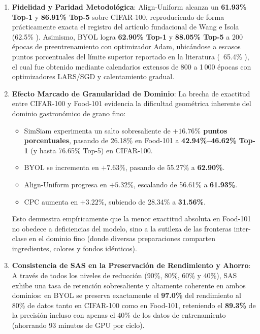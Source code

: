 \begin{enumerate}
    \item \textbf{Fidelidad y Paridad Metodológica}:
    Align-Uniform alcanza un \textbf{61.93\% Top-1} y \textbf{86.91\% Top-5} sobre CIFAR-100, reproduciendo de forma prácticamente exacta el registro del artículo fundacional de Wang e Isola (62.5\% \cite{wang2020alignuniform}). Asimismo, BYOL logra \textbf{62.90\% Top-1} y \textbf{88.05\% Top-5} a 200 épocas de preentrenamiento con optimizador Adam, ubicándose a escasos puntos porcentuales del límite superior reportado en la literatura (~65.4\% \cite{grill2020byol}), el cual fue obtenido mediante calendarios extensos de 800 a 1\,000 épocas con optimizadores LARS/SGD y calentamiento gradual.
    
    \item \textbf{Efecto Marcado de Granularidad de Dominio}:
    La brecha de exactitud entre CIFAR-100 y Food-101 evidencia la dificultad geométrica inherente del dominio gastronómico de grano fino:
    \begin{itemize}
        \item SimSiam experimenta un salto sobresaliente de \textbf{$+16.76\%$ puntos porcentuales}, pasando de 26.18\% en Food-101 a \textbf{42.94\%--46.62\% Top-1} (y hasta 76.65\% Top-5) en CIFAR-100.
        \item BYOL se incrementa en \textbf{$+7.63\%$}, pasando de 55.27\% a \textbf{62.90\%}.
        \item Align-Uniform progresa en \textbf{$+5.32\%$}, escalando de 56.61\% a \textbf{61.93\%}.
        \item CPC aumenta en \textbf{$+3.22\%$}, subiendo de 28.34\% a \textbf{31.56\%}.
    \end{itemize}
    Esto demuestra empíricamente que la menor exactitud absoluta en Food-101 no obedece a deficiencias del modelo, sino a la sutileza de las fronteras inter-clase en el dominio fino (donde diversas preparaciones comparten ingredientes, colores y fondos idénticos).
    
    \item \textbf{Consistencia de SAS en la Preservación de Rendimiento y Ahorro}:
    A través de todos los niveles de reducción (90\%, 80\%, 60\% y 40\%), SAS exhibe una tasa de retención sobresaliente y altamente coherente en ambos dominios: en BYOL se preserva exactamente el \textbf{97.0\%} del rendimiento al 80\% de datos tanto en CIFAR-100 como en Food-101, reteniendo el \textbf{89.3\%} de la precisión incluso con apenas el 40\% de los datos de entrenamiento (ahorrando 93 minutos de GPU por ciclo). 
    

\end{enumerate}
